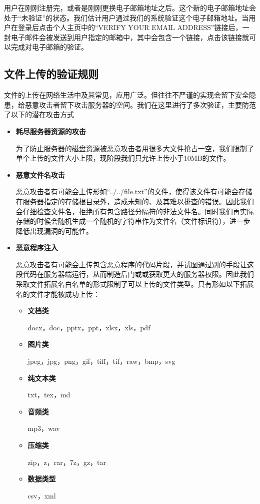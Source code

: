 用户在刚刚注册完，或者是刚刚更换电子邮箱地址之后。这个新的电子邮箱地址会处于“未验证”的状态。我们估计用户通过我们的系统验证这个电子邮箱地址。当用户在登录后点击个人主页中的“VERIFY YOUR EMAIL ADDRESS”链接后，一封电子邮件会被发送到用户指定的邮箱中，其中会包含一个链接，点击该链接就可以完成对电子邮箱的验证。

\subsection{文件上传的验证规则}\label{sec:fileV}

文件的上传在网络生活中及其常见，应用广泛。但往往不严谨的实现会留下安全隐患，给恶意攻击者留下攻击服务器的空间。我们在这里进行了多次验证，主要防范了以下的潜在攻击方式
\begin{itemize}

	\item \textbf{耗尽服务器资源的攻击}
	
	为了防止服务器的磁盘资源被恶意攻击者用很多大文件抢占一空，我们限制了单个上传的文件大小上限，现阶段我们只允许上传小于10MB的文件。
	
	\item \textbf{恶意文件名攻击}
	
	恶意攻击者有可能会上传形如“../../file.txt”的文件，使得该文件有可能会存储在服务器指定的存储根目录外，造成未知的、及其难以排查的错误。因此我们会仔细检查文件名，拒绝所有包含路径分隔符的非法文件名。同时我们再实际存储的时候会随机生成一个随机的字符串作为文件名（文件标识符），进一步降低出现漏洞的可能性。
	
	\item \textbf{恶意程序注入}
	
	恶意攻击者有可能会上传包含恶意程序的代码片段，并试图通过别的手段让这段代码在服务器端运行，从而制造后门或或获取更大的服务器权限。因此我们采取文件拓展名白名单的形式限制了可以上传的文件类型。只有形如以下拓展名的文件才能被成功上传：
	\begin{itemize}
		\item \textbf{文档类}
		
		docx，doc，pptx，ppt，xlsx，xls，pdf
		
		\item \textbf{图片类}
		
		jpeg，jpg，png，gif，tiff，tif，raw，bmp，svg
		
		\item \textbf{纯文本类}
		
		txt，tex，md
		
		\item \textbf{音频类}
		
		mp3，wav
		
		\item \textbf{压缩类}
		
		zip，z，rar，7z，gz，tar
		
		\item \textbf{数据类型}
		
		csv，xml
	\end{itemize}

\end{itemize}

